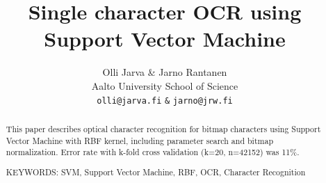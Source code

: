 \documentclass{netsec2012}
\begin{document}

\title{Single character OCR using Support Vector Machine}

\author{Olli Jarva \& Jarno Rantanen \\
        Aalto University School of Science \\
	\texttt{olli@jarva.fi} \texttt{\&} \texttt{jarno@jrw.fi}}
\maketitle


\begin{abstract}
  This paper describes optical character recognition for bitmap characters
  using Support Vector Machine with RBF kernel, including parameter search
  and bitmap normalization. 
  Error rate with k-fold cross validation (k=20, n=42152) was 11\%.

\vspace{3mm}
\noindent KEYWORDS: SVM, Support Vector Machine, RBF, OCR, Character Recognition

\end{abstract}





\end{document}
